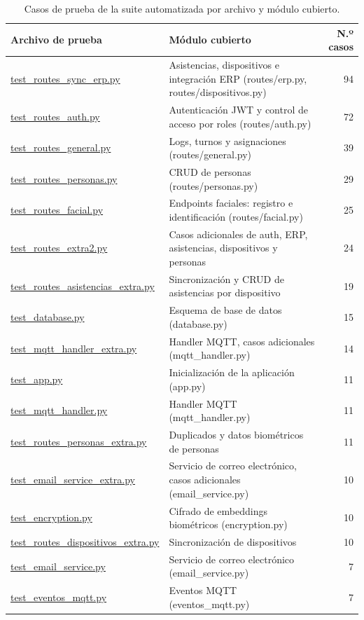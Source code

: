 \documentclass{iccmemoria}
\begin{document}
\begin{table}[H]
\caption{Casos de prueba de la suite automatizada por archivo y módulo cubierto.}
\label{tab:anexoD_casos_prueba}
\centering
\footnotesize
\begin{tabular}{@{}p{4.0cm}p{6.6cm}r@{}}
\toprule
\textbf{Archivo de prueba} & \textbf{Módulo cubierto} & \textbf{N.º casos} \\
\midrule
\url{test_routes_sync_erp.py} & Asistencias, dispositivos e integración ERP (routes/erp.py, routes/dispositivos.py) & 94 \\
\url{test_routes_auth.py} & Autenticación JWT y control de acceso por roles (routes/auth.py) & 72 \\
\url{test_routes_general.py} & Logs, turnos y asignaciones (routes/general.py) & 39 \\
\url{test_routes_personas.py} & CRUD de personas (routes/personas.py) & 29 \\
\url{test_routes_facial.py} & Endpoints faciales: registro e identificación (routes/facial.py) & 25 \\
\url{test_routes_extra2.py} & Casos adicionales de auth, ERP, asistencias, dispositivos y personas & 24 \\
\url{test_routes_asistencias_extra.py} & Sincronización y CRUD de asistencias por dispositivo & 19 \\
\url{test_database.py} & Esquema de base de datos (database.py) & 15 \\
\url{test_mqtt_handler_extra.py} & Handler MQTT, casos adicionales (mqtt\_handler.py) & 14 \\
\url{test_app.py} & Inicialización de la aplicación (app.py) & 11 \\
\url{test_mqtt_handler.py} & Handler MQTT (mqtt\_handler.py) & 11 \\
\url{test_routes_personas_extra.py} & Duplicados y datos biométricos de personas & 11 \\
\url{test_email_service_extra.py} & Servicio de correo electrónico, casos adicionales (email\_service.py) & 10 \\
\url{test_encryption.py} & Cifrado de embeddings biométricos (encryption.py) & 10 \\
\url{test_routes_dispositivos_extra.py} & Sincronización de dispositivos & 10 \\
\url{test_email_service.py} & Servicio de correo electrónico (email\_service.py) & 7 \\
\url{test_eventos_mqtt.py} & Eventos MQTT (eventos\_mqtt.py) & 7 \\

\end{tabular}
\end{table}
\end{document}
